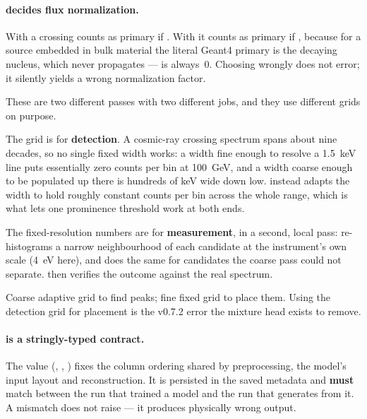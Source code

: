 \documentclass[11pt,a4paper]{article}
\begin{document}
\paragraph{ decides flux normalization.} With
 a crossing counts as primary if .
With  it counts as primary if
, because for a source embedded
in bulk material the literal Geant4 primary is the decaying nucleus, which
never propagates ---  is always~0. Choosing wrongly does not
error; it silently yields a wrong normalization factor.

\begin{maginote}
These are two different passes with two different jobs, and they use different
grids on purpose.

The  grid is for \textbf{detection}. A cosmic-ray
crossing spectrum spans about nine decades, so no single fixed width works: a
width fine enough to resolve a 1.5~keV line puts essentially zero counts per bin
at 100~GeV, and a width coarse enough to be populated up there is hundreds of keV
wide down low.  instead adapts the width to hold roughly
constant counts per bin across the whole range, which is what lets one
prominence threshold work at both ends.

The fixed-resolution numbers are for \textbf{measurement}, in a second, local
pass:  re-histograms a narrow neighbourhood of
each candidate at the instrument's own scale (4~eV here), and
 does the same for candidates the
coarse pass could not separate.  then
verifies the outcome against the real spectrum.

Coarse adaptive grid to find peaks; fine fixed grid to place them. Using the
detection grid for placement is the v0.7.2 error the mixture head exists to
remove.
\end{maginote}

\paragraph{ is a stringly-typed contract.} The value
(, ,
) fixes the column ordering shared
by preprocessing, the model's input layout and reconstruction. It is persisted
in the saved metadata and \textbf{must} match between the run that trained a
model and the run that generates from it. A mismatch does not raise --- it
produces physically wrong output.
\end{document}
